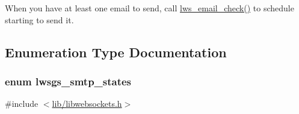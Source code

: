 When you have at least one email to send, call \hyperlink{group__smtp_ga5e535e346d92a9daf00be33abf79d4eb}{lws\+\_\+email\+\_\+check()} to schedule starting to send it. 

\subsection{Enumeration Type Documentation}
\subsubsection[{\texorpdfstring{lwsgs\+\_\+smtp\+\_\+states}{lwsgs\_smtp\_states}}]{\setlength{\rightskip}{0pt plus 5cm}enum {\bf lwsgs\+\_\+smtp\+\_\+states}}\hypertarget{group__smtp_ga116be79bf44f9dc2a97f46e051fe4dc0}{}\label{group__smtp_ga116be79bf44f9dc2a97f46e051fe4dc0}


{\ttfamily \#include $<$\hyperlink{libwebsockets_8h}{lib/libwebsockets.\+h}$>$}

